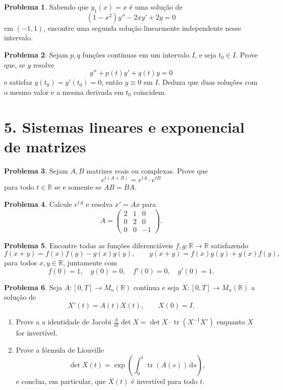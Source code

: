 \documentclass[10pt,a4paper]{amsart}
\newcommand{\R}{\mathbb{R}}
\renewcommand{\d}{\mathrm{d}}
\theoremstyle{definition}
\newtheorem{problema}{Problema}
\begin{document}
\begin{problema}
Sabendo que $y_1(x)=x$ é uma solução de
\[
    (1-x^2)y''-2xy'+2y=0
\]
em $(-1,1)$, encontre uma segunda solução linearmente independente nesse
intervalo.
\end{problema}

\begin{problema}
Sejam $p,q$ funções contínuas em um intervalo $I$, e seja $t_0\in I$. Prove
que, se $y$ resolve
\[
    y''+p(t)y'+q(t)y=0
\]
e satisfaz $y(t_0)=y'(t_0)=0$, então $y\equiv 0$ em $I$. Deduza que duas
soluções com o mesmo valor e a mesma derivada em $t_0$ coincidem.
\end{problema}

\section*{5. Sistemas lineares e exponencial de matrizes}

\begin{problema}
Sejam $A,B$ matrizes reais ou complexas. Prove que
\[
    e^{t(A+B)}=e^{tA}\cdot e^{tB}
\]
para todo $t\in\R$ se e somente se $AB=BA$.
\end{problema}

\begin{problema}
Calcule $e^{tA}$ e resolva $x'=Ax$ para
\[
    A=\begin{pmatrix}
        2 & 1 & 0\\
        0 & 2 & 0\\
        0 & 0 & -1
    \end{pmatrix}.
\]
\end{problema}

\begin{problema}
Encontre todas as funções diferenciáveis $f,g:\R\to\R$ satisfazendo
\[
    f(x+y)=f(x)f(y)-g(x)g(y),
    \qquad
    g(x+y)=f(x)g(y)+g(x)f(y),
\]
para todos $x,y\in\R$, juntamente com
\[
    f(0)=1,\quad g(0)=0,\quad f'(0)=0,\quad g'(0)=1.
\]
\end{problema}

\begin{problema}
Seja $A:[0,T]\to M_n(\R)$ contínua e seja $X:[0,T]\to M_n(\R)$ a solução de
\[
    X'(t)=A(t)X(t),
    \qquad X(0)=I.
\]
\begin{enumerate}
    \item[(a)] Prove a a identidade de Jacobi
$\tfrac{\d}{\d t}\det X=\det X\cdot\operatorname{tr}(X^{-1}X')$ enquanto $X$
for invertível.
\item[(b)] Prove a fórmula de Liouville
\[
    \det X(t)=\exp\left(\int_0^t \operatorname{tr}(A(s))\,\d s\right),
\]
e conclua, em particular, que $X(t)$ é invertível para todo $t$.
\end{enumerate}
\end{problema}
\end{document}
